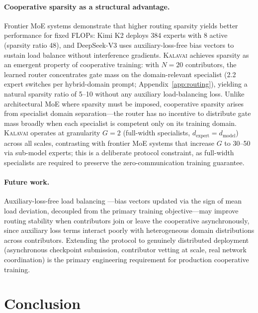 \documentclass{article}
\newcommand{\kalavai}{\textsc{Kalavai}\xspace}
\begin{document}
\paragraph{Cooperative sparsity as a structural advantage.} Frontier MoE systems demonstrate that higher routing sparsity yields better performance for fixed FLOPs: Kimi K2 \citep{moonshotai2025kimik2} deploys 384 experts with 8 active (sparsity ratio 48), and DeepSeek-V3 \citep{liu2024deepseekv3} uses auxiliary-loss-free bias vectors to sustain load balance without interference gradients. \kalavai achieves sparsity as an emergent property of cooperative training: with $N=20$ contributors, the learned router concentrates gate mass on the domain-relevant specialist (2.2 expert switches per hybrid-domain prompt; Appendix~\ref{app:routing}), yielding a natural sparsity ratio of 5--10 without any auxiliary load-balancing loss. Unlike architectural MoE where sparsity must be imposed, cooperative sparsity arises from specialist domain separation---the router has no incentive to distribute gate mass broadly when each specialist is competent only on its training domain. \kalavai operates at granularity $G=2$ (full-width specialists, $d_\text{expert}=d_\text{model}$) across all scales, contrasting with frontier MoE systems that increase $G$ to 30--50 via sub-model experts; this is a deliberate protocol constraint, as full-width specialists are required to preserve the zero-communication training guarantee.

\paragraph{Future work.} Auxiliary-loss-free load balancing \citep{liu2024deepseekv3}---bias vectors updated via the sign of mean load deviation, decoupled from the primary training objective---may improve routing stability when contributors join or leave the cooperative asynchronously, since auxiliary loss terms interact poorly with heterogeneous domain distributions across contributors. Extending the protocol to genuinely distributed deployment (asynchronous checkpoint submission, contributor vetting at scale, real network coordination) is the primary engineering requirement for production cooperative training.

\section{Conclusion}
\label{sec:conclusion}
\end{document}
